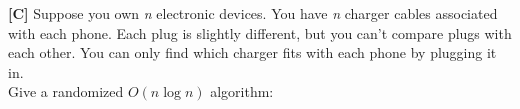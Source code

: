\documentclass[12pt]{article}
\theoremstyle{definition}
\begin{document}
\textbf{[C]} Suppose you own \emph{n} electronic devices.
You have \emph{n} charger cables associated with each phone.
Each plug is slightly different, but you can't compare plugs with each other.
You can only find which charger fits with each phone by plugging it in. \\
Give a randomized $O(n\log n)$ algorithm:
\end{document}
